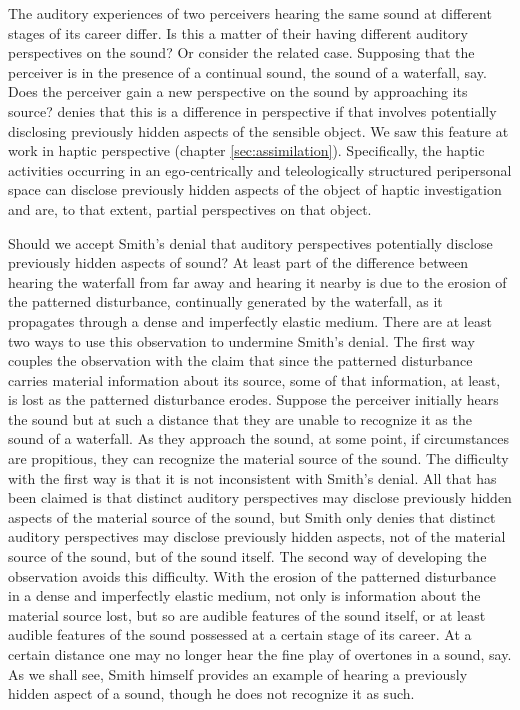 The auditory experiences of two perceivers hearing the same sound at different stages of its career differ. Is this a matter of their having different auditory perspectives on the sound? Or consider the related case. Supposing that the perceiver is in the presence of a continual sound, the sound of a waterfall, say. Does the perceiver gain a new perspective on the sound by approaching its source? \citet[135]{Smith:2002sa} denies that this is a difference in perspective if that involves potentially disclosing previously hidden aspects of the sensible object. We saw this feature at work in haptic perspective (chapter \ref{sec:assimilation}). Specifically, the haptic activities occurring in an ego-centrically and teleologically structured peripersonal space can disclose previously hidden aspects of the object of haptic investigation and are, to that extent, partial perspectives on that object. 

Should we accept Smith's denial that auditory perspectives potentially disclose previously hidden aspects of sound? At least part of the difference between hearing the waterfall from far away and hearing it nearby is due to the erosion of the patterned disturbance, continually generated by the waterfall, as it propagates through a dense and imperfectly elastic medium. There are at least two ways to use this observation to undermine Smith's denial. The first way couples the observation with the claim that since the patterned disturbance carries material information about its source, some of that information, at least, is lost as the patterned disturbance erodes. Suppose the perceiver initially hears the sound but at such a distance that they are unable to recognize it as the sound of a waterfall. As they approach the sound, at some point, if circumstances are propitious, they can recognize the material source of the sound. The difficulty with the first way is that it is not inconsistent with Smith's denial. All that has been claimed is that distinct auditory perspectives may disclose previously hidden aspects of the material source of the sound, but Smith only denies that distinct auditory perspectives may disclose previously hidden aspects, not of the material source of the sound, but of the sound itself. The second way of developing the observation avoids this difficulty. With the erosion of the patterned disturbance in a dense and imperfectly elastic medium, not only is information about the material source lost, but so are audible features of the sound itself, or at least audible features of the sound possessed at a certain stage of its career. At a certain distance one may no longer hear the fine play of overtones in a sound, say. As we shall see, Smith himself provides an example of hearing a previously hidden aspect of a sound, though he does not recognize it as such.


